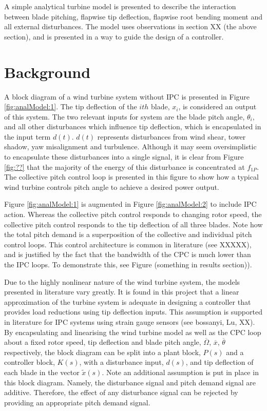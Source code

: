 
A simple analytical turbine model is presented to describe the interaction between blade pitching, flapwise tip deflection, flapwise root bending moment and all external disturbances. The model uses observations in section XX (the above section), and is presented in a way to guide the design of a controller.


\section{Background}



A block diagram of a wind turbine system without IPC is presented in Figure \ref{fig:analModel:1}. The tip deflection of the $ith$ blade, $x_i$, is considered an output of this system. The two relevant inputs for system are the blade pitch angle, $\theta_i$, and all other disturbances which influence tip deflection, which is encapsulated in the input term $d(t)$. $d(t)$ represents disturbances from wind shear, tower shadow, yaw misalignment and turbulence. Although it may seem oversimplistic to encapsulate these disturbances into a single signal, it is clear from Figure \ref{fig:??} that the majority of the energy of this disturbance is concentrated at $f_{1P}$. The collective pitch control loop is presented in this figure to show how a typical wind turbine controls pitch angle to achieve a desired power output. 


Figure \ref{fig:analModel:1} is augmented in Figure \ref{fig:analModel:2} to include IPC action. Whereas the collective pitch control responds to changing rotor speed, the collective pitch control responds to the tip deflection of all three blades. Note how the total pitch demand is a superposition of the collective and individual pitch control loops. This control architecture is common in literature (see XXXXX), and is justified by the fact that the bandwidth of the CPC is much lower than the IPC loops. To demonstrate this, see Figure (something in results section)). 


Due to the highly nonlinear nature of the wind turbine system, the models presented in literature vary greatly. It is found in this project that a linear approximation of the turbine system is adequate in designing a controller that provides load reductions using tip deflection inputs. This assumption is supported in literature for IPC systems using strain gauge sensors (see bossanyi, Lu, XX). By encapsulating and linearising the wind turbine model as well as the CPC loop about a fixed rotor speed, tip deflection and blade pitch angle, $\overline{\Omega}$, $\overline{x}$, $\overline{\theta}$ respectively, the block diagram can be split into a plant block, $P(s)$ and a controller block, $K(s)$, with a disturbance input, $d(s)$, and tip deflection of each blade in the vector $\tilde{x}(s)$. Note an additional assumption is put in place in this block diagram. Namely, the disturbance signal and pitch demand signal are additive. Therefore, the effect of any disturbance signal can be rejected by providing an appropriate pitch demand signal. 


